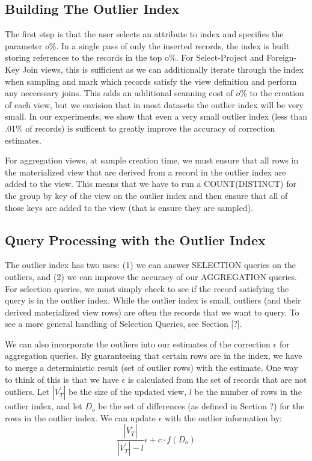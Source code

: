 \subsection{Building The Outlier Index}
The first step is that the user selects an attribute to index and specifies the parameter $o\%$.
In a single pass of only the inserted records, the index is built storing references to the records in the top o\%.
For Select-Project and Foreign-Key Join views, this is sufficient as we can additionally iterate through the index when sampling and mark 
which records satisfy the view definition and perform any neccessary joins. 
This adds an additional scanning cost of $o\%$ to the creation of each view, but we envision that in most datasets the outlier index will be
very small.
In our experiments, we show that even a very small outlier index (less than .01\% of records) is sufficent to greatly improve the accuracy of
correction estimates.

For aggregation views, at sample creation time, we must ensure that all rows in the materialized view that are derived from a record in the outlier index are added to the view. 
This means that we have to run a COUNT(DISTINCT) for the group by key of the view on the outlier index and then ensure that all of those keys are added to the view (that is ensure they are sampled).

\subsection{Query Processing with the Outlier Index}
The outlier index has two uses: (1) we can answer SELECTION queries on the outliers, 
and (2) we can improve the accuracy of our AGGREGATION queries.
For selection queries, we must simply check to see if the record satisfying the query is in the outlier index.
While the outlier index is small, outliers (and their derived materialized view rows) are often the records that
we want to query.
To see a more general handling of Selection Queries, see Section [?].

We can also incorporate the outliers into our estimates of the correction
$\epsilon$ for aggregation queries. By guaranteeing that certain rows are in the index, we
have to merge a deterministic result (set of outlier rows) with the
estimate. One way to think of this is that we have $\epsilon$ is
calculated from the set of records that are not outliers. Let $|V_{T}^{'}|$
be the size of the updated view, $l$ be the number of rows in the
outlier index, and let $D_{o}$ be the set of differences (as defined
in Section ?) for the rows in the outlier index. We can update $\epsilon$
with the outlier information by:
\[
\frac{|V_{T}^{'}|}{|V_{T}^{'}|-l}\epsilon+c\cdot f(D_{o})
\]


